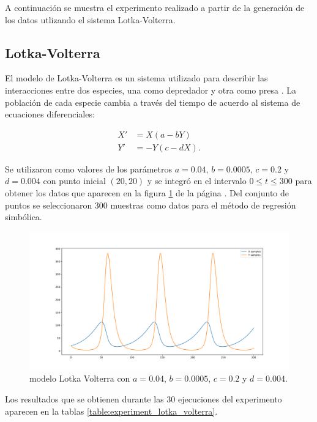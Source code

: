 A continuación se muestra el experimento realizado a partir de la generación de los datos utlizando el sistema Lotka-Volterra.

\subsection{Lotka-Volterra}

El modelo de Lotka-Volterra es un sistema utilizado para describir las interacciones entre dos especies, una como depredador y otra como presa \cite{Hoppensteadt:2006}. La población de cada especie cambia a través del tiempo de acuerdo al sistema de ecuaciones diferenciales:

\begin{align*}
    X' & = X (a - b Y)   \\
    Y' & = -Y (c - d X).
\end{align*}

Se utilizaron como valores de los parámetros $a = 0.04$, $b = 0.0005$, $c = 0.2$ y $d = 0.004$ con punto inicial $(20, 20)$ y se integró en el intervalo $0 \leq t \leq 300$ para obtener los datos que aparecen en la figura \ref{fig:lotka_volterra} de la página \pageref{fig:lotka_volterra}. Del conjunto de puntos se seleccionaron 300 muestras como datos para el método de regresión simbólica.

\begin{figure}[h]
    \centering
    \includegraphics[width=\textwidth]{"figures/lotka_volterra.pdf"}
    \caption{modelo Lotka Volterra con $a = 0.04$, $b = 0.0005$, $c = 0.2$ y $d = 0.004$.}
    \label{fig:lotka_volterra}
\end{figure}

Los resultados que se obtienen durante las 30 ejecuciones del experimento aparecen en la tablas \ref{table:experiment_lotka_volterra}.

